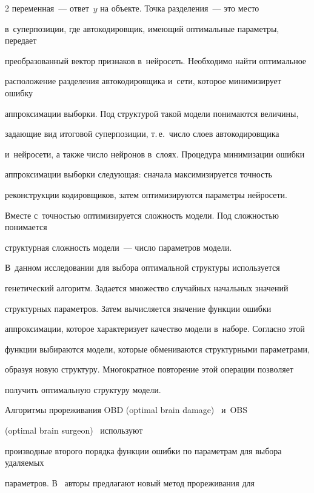\begin{multicols}{2}
переменная~--- ответ~$y$ на объекте.  Точка разделения~--- это место 


в~суперпозиции, где автокодировщик, име\-ющий оптимальные параметры, передает 


преобразованный вектор признаков в~нейросеть. Необходимо найти оптимальное 


расположение разделения автокодировщика и~сети, которое минимизирует ошибку 


аппроксимации выборки. Под структурой такой модели понимаются величины, 


за\-да\-ющие вид итоговой суперпозиции,  т.\,е.\ чис\-ло слоев автокодировщика 


и~нейросети, а также число нейронов в~слоях. Процедура минимизации ошибки 


аппроксимации выборки следующая: сначала максимизируется точность 


реконструкции кодировщиков, затем оптимизируются параметры нейросети. 


Вмес\-те с~точностью оптимизируется сложность модели. Под сложностью понимается 


{структурная сложность модели}~--- число параметров модели.





В~данном исследовании для выбора оптимальной структуры используется 


генетический алгоритм. Задается множество случайных начальных значений 


структурных параметров. Затем вычисляется значение функции ошибки 


аппроксимации, которое характеризует качество модели в~наборе. Согласно этой 


функции выбираются модели, которые обмениваются структурными параметрами, 


образуя новую структуру. Многократное повторение этой операции позволяет 


получить оптимальную структуру модели. 





Алгоритмы прореживания OBD (optimal brain damage)~\cite{second} и~OBS


(optimal brain surgeon)~\cite{nine} используют 


производные второго порядка функции ошибки по параметрам для выбора удаляемых 


параметров. В~\cite{eight} авторы предлагают новый метод прореживания для 



\end{multicols}
